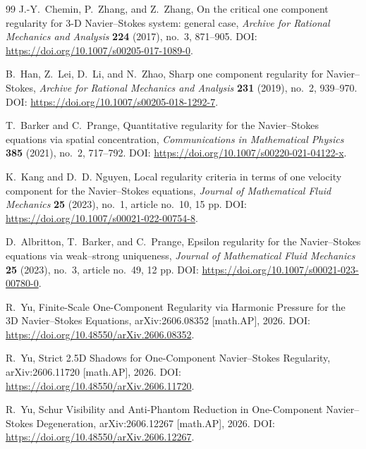 \documentclass[11pt]{article}
\numberwithin{equation}{section}
\theoremstyle{definition}
\theoremstyle{remark}
\begin{document}
\begin{thebibliography}{99}
J.-Y.~Chemin, P.~Zhang, and Z.~Zhang,
\newblock On the critical one component regularity for 3-D Navier--Stokes system: general case,
\newblock \emph{Archive for Rational Mechanics and Analysis} \textbf{224} (2017), no.~3, 871--905.
\newblock DOI: \url{https://doi.org/10.1007/s00205-017-1089-0}.

B.~Han, Z.~Lei, D.~Li, and N.~Zhao,
\newblock Sharp one component regularity for Navier--Stokes,
\newblock \emph{Archive for Rational Mechanics and Analysis} \textbf{231} (2019), no.~2, 939--970.
\newblock DOI: \url{https://doi.org/10.1007/s00205-018-1292-7}.

T.~Barker and C.~Prange,
\newblock Quantitative regularity for the Navier--Stokes equations via spatial concentration,
\newblock \emph{Communications in Mathematical Physics} \textbf{385} (2021), no.~2, 717--792.
\newblock DOI: \url{https://doi.org/10.1007/s00220-021-04122-x}.

K.~Kang and D.~D. Nguyen,
\newblock Local regularity criteria in terms of one velocity component for the Navier--Stokes equations,
\newblock \emph{Journal of Mathematical Fluid Mechanics} \textbf{25} (2023), no.~1, article no.~10, 15 pp.
\newblock DOI: \url{https://doi.org/10.1007/s00021-022-00754-8}.

D.~Albritton, T.~Barker, and C.~Prange,
\newblock Epsilon regularity for the Navier--Stokes equations via weak--strong uniqueness,
\newblock \emph{Journal of Mathematical Fluid Mechanics} \textbf{25} (2023), no.~3, article no.~49, 12 pp.
\newblock DOI: \url{https://doi.org/10.1007/s00021-023-00780-0}.

R.~Yu,
\newblock Finite-Scale One-Component Regularity via Harmonic Pressure for the 3D Navier--Stokes Equations,
\newblock arXiv:2606.08352 [math.AP], 2026.
\newblock DOI: \url{https://doi.org/10.48550/arXiv.2606.08352}.

R.~Yu,
\newblock Strict 2.5D Shadows for One-Component Navier--Stokes Regularity,
\newblock arXiv:2606.11720 [math.AP], 2026.
\newblock DOI: \url{https://doi.org/10.48550/arXiv.2606.11720}.

R.~Yu,
\newblock Schur Visibility and Anti-Phantom Reduction in One-Component Navier--Stokes Degeneration,
\newblock arXiv:2606.12267 [math.AP], 2026.
\newblock DOI: \url{https://doi.org/10.48550/arXiv.2606.12267}.


\end{thebibliography}
\end{document}
